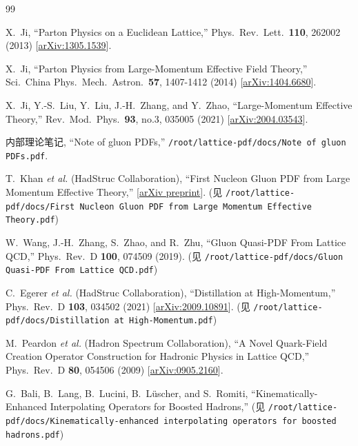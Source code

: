 \documentclass[12pt,a4paper]{ctexart}
\begin{document}
\begin{thebibliography}{99}

X.~Ji,
``Parton Physics on a Euclidean Lattice,''
Phys.\ Rev.\ Lett.\ \textbf{110}, 262002 (2013)
[\href{https://arxiv.org/abs/1305.1539}{arXiv:1305.1539}].

X.~Ji,
``Parton Physics from Large-Momentum Effective Field Theory,''
Sci.\ China Phys.\ Mech.\ Astron.\ \textbf{57}, 1407-1412 (2014)
[\href{https://arxiv.org/abs/1404.6680}{arXiv:1404.6680}].

X.~Ji, Y.-S.~Liu, Y.~Liu, J.-H.~Zhang, and Y.~Zhao,
``Large-Momentum Effective Theory,''
Rev.\ Mod.\ Phys.\ \textbf{93}, no.3, 035005 (2021)
[\href{https://arxiv.org/abs/2004.03543}{arXiv:2004.03543}].

内部理论笔记,
``Note of gluon PDFs,''
\texttt{/root/lattice-pdf/docs/Note of gluon PDFs.pdf}.

T.~Khan \textit{et al.} (HadStruc Collaboration),
``First Nucleon Gluon PDF from Large Momentum Effective Theory,''
[\href{https://arxiv.org/abs/XXXX.XXXXX}{arXiv preprint}].
(见 \texttt{/root/lattice-pdf/docs/First Nucleon Gluon PDF from Large Momentum Effective Theory.pdf})

W.~Wang, J.-H.~Zhang, S.~Zhao, and R.~Zhu,
``Gluon Quasi-PDF From Lattice QCD,''
Phys.\ Rev.\ D \textbf{100}, 074509 (2019).
(见 \texttt{/root/lattice-pdf/docs/Gluon Quasi-PDF From Lattice QCD.pdf})

C.~Egerer \textit{et al.} (HadStruc Collaboration),
``Distillation at High-Momentum,''
Phys.\ Rev.\ D \textbf{103}, 034502 (2021)
[\href{https://arxiv.org/abs/2009.10891}{arXiv:2009.10891}].
(见 \texttt{/root/lattice-pdf/docs/Distillation at High-Momentum.pdf})

M.~Peardon \textit{et al.} (Hadron Spectrum Collaboration),
``A Novel Quark-Field Creation Operator Construction for Hadronic Physics in Lattice QCD,''
Phys.\ Rev.\ D \textbf{80}, 054506 (2009)
[\href{https://arxiv.org/abs/0905.2160}{arXiv:0905.2160}].

G.~Bali, B.~Lang, B.~Lucini, B.~L\"uscher, and S.~Romiti,
``Kinematically-Enhanced Interpolating Operators for Boosted Hadrons,''
(见 \texttt{/root/lattice-pdf/docs/Kinematically-enhanced interpolating operators for boosted hadrons.pdf})


\end{thebibliography}
\end{document}
